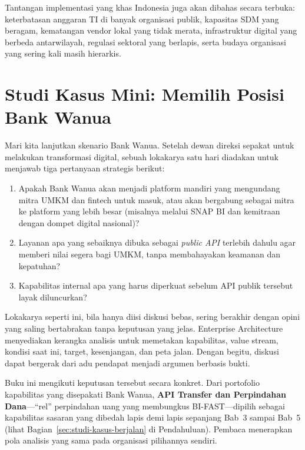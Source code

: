 Tantangan implementasi yang khas Indonesia juga akan dibahas secara terbuka:
keterbatasan anggaran TI di banyak organisasi publik, kapasitas SDM yang
beragam, kematangan vendor lokal yang tidak merata, infrastruktur digital
yang berbeda antarwilayah, regulasi sektoral yang berlapis, serta budaya
organisasi yang sering kali masih hierarkis.

\section{Studi Kasus Mini: Memilih Posisi Bank Wanua}

Mari kita lanjutkan skenario Bank Wanua. Setelah dewan direksi sepakat untuk
melakukan transformasi digital, sebuah lokakarya satu hari diadakan untuk
menjawab tiga pertanyaan strategis berikut:

\begin{enumerate}
  \item Apakah Bank Wanua akan menjadi platform mandiri yang mengundang mitra
        UMKM dan fintech untuk masuk, atau akan bergabung sebagai mitra ke
        platform yang lebih besar (misalnya melalui SNAP BI dan kemitraan
        dengan dompet digital nasional)?
  \item Layanan apa yang sebaiknya dibuka sebagai \emph{public API} terlebih
        dahulu agar memberi nilai segera bagi UMKM, tanpa membahayakan keamanan
        dan kepatuhan?
  \item Kapabilitas internal apa yang harus diperkuat sebelum API publik
        tersebut layak diluncurkan?
\end{enumerate}

Lokakarya seperti ini, bila hanya diisi diskusi bebas, sering berakhir dengan
opini yang saling bertabrakan tanpa keputusan yang jelas. Enterprise
Architecture menyediakan kerangka analisis untuk memetakan kapabilitas, value
stream, kondisi saat ini, target, kesenjangan, dan peta jalan. Dengan begitu,
diskusi dapat bergerak dari adu pendapat menjadi argumen berbasis bukti.

Buku ini mengikuti keputusan tersebut secara konkret. Dari portofolio
kapabilitas yang disepakati Bank Wanua, \textbf{API Transfer dan Perpindahan
Dana}---``rel'' perpindahan uang yang membungkus BI-FAST---dipilih sebagai
kapabilitas sasaran yang dibedah lapis demi lapis sepanjang Bab~3 sampai Bab~5
(lihat Bagian~\ref{sec:studi-kasus-berjalan} di Pendahuluan). Pembaca menerapkan
pola analisis yang sama pada organisasi pilihannya sendiri.

